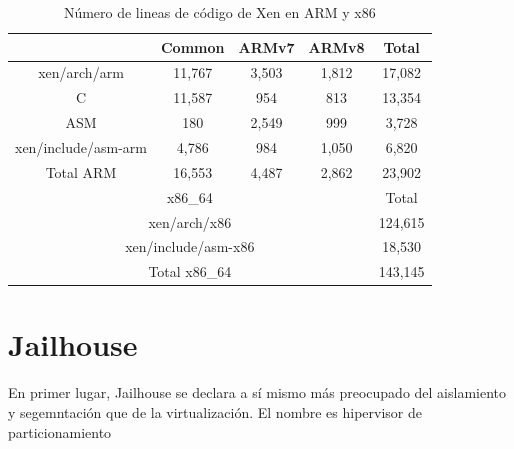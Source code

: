 \begin{table}[ht]

	\label{table:results45}
  \centering

	\begin{tabular}{ |c|c|c|c|c| }
		\hline
     & Common & ARMv7 & ARMv8 & Total\\
    \hline
    xen/arch/arm          & 11,767      & 3,503  & 1,812   & 17,082 \\
    \hline
    C                     & 11,587      & 954    & 813	    & 13,354 \\
    \hline
    ASM                   & 180         & 2,549  & 999     & 3,728  \\
    \hline
    xen/include/asm-arm   & 4,786       & 984    & 1,050   & 6,820  \\
    \hline
    Total ARM	            & 16,553  & 4,487  & 2,862        & 23,902 \\
    \hline
    \multicolumn{4}{|c|}{x86\_64}                           & Total\\
    \hline
    \multicolumn{4}{|c|}{xen/arch/x86}                      & 124,615\\
    \hline
    \multicolumn{4}{|c|}{xen/include/asm-x86}               & 18,530 \\
    \hline
    \multicolumn{4}{|c|}{Total x86\_64}                     & 143,145\\
    \hline
	\end{tabular}
	\caption{Número de lineas de código de Xen en ARM y x86 \cite{xen_arm_whitepaper}}

\end{table}

\section{Jailhouse}

En primer lugar, Jailhouse se declara a sí mismo más preocupado del aislamiento y segemntación que de la virtualización. El nombre es hipervisor de particionamiento
